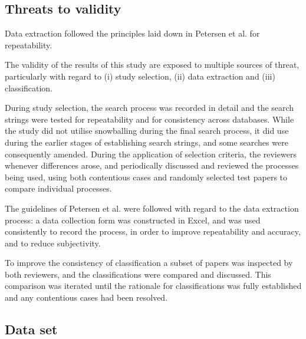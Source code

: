 \DIFaddend \subsection{Threats to validity}

Data extraction followed the principles laid down in Petersen et al. \cite{Petersen2015} for repeatability.

The validity of the results of this study are exposed to multiple sources of threat, particularly with regard to (i) study selection, (ii) data extraction and (iii) classification.

During study selection, the search process was recorded in detail and the search strings were tested for repeatability and for consistency across databases. \DIFaddbegin {}\DIFaddend While the study did not utilise snowballing \DIFdelbegin {}\DIFdelend during the final search process, it did use \DIFdelbegin {}\DIFdelend \DIFaddbegin {}\DIFaddend during the earlier stages of establishing search strings, and some searches were consequently amended. During the application of selection criteria, the reviewers \DIFdelbegin {}\DIFdelend \DIFaddbegin {}\DIFaddend whenever differences arose, and periodically discussed and reviewed the processes being used, using both contentious cases and randomly selected test papers to compare individual processes.

The guidelines of Petersen et al. \cite{Petersen2008, Petersen2015} were followed with regard to the data extraction process: a data collection form was constructed in Excel, and was used consistently to record the process, in order to improve repeatability and accuracy, and to reduce subjectivity.

To improve the consistency of classification a subset of papers was inspected by both reviewers, and the classifications were compared and discussed. This comparison was iterated until the rationale for classifications was fully established and any contentious cases had been resolved.

\subsection{Data set}


